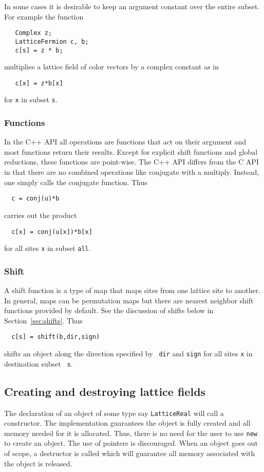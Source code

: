 \documentclass[12pt,letterpaper]{article}
\newcommand{\cpp}{C++}
\begin{document}
In some cases it is desirable to keep an argument constant over the
entire subset.  For example the function
%
\begin{verbatim}
   Complex z;
   LatticeFermion c, b;
   c[s] = z * b;
\end{verbatim}
%
multiplies a lattice field of color vectors by a complex constant as in
%
\begin{verbatim}
   c[x] = z*b[x]
\end{verbatim}
%
for {\tt x} in subset {\tt s}.

\subsubsection{Functions}

In the \cpp{} API all operations are functions that act on their
argument and most functions return their results. Except for explicit
shift functions and global reductions, these functions are point-wise.
The \cpp{} API differs from the C API in that there are no combined
operations like conjugate with a multiply.  Instead, one simply calls
the conjugate function.  Thus
%
\begin{verbatim}
  c = conj(u)*b
\end{verbatim}
%
carries out the product
%
\begin{verbatim}
  c[x] = conj(u[x])*b[x]
\end{verbatim}
%
for all sites {\tt x} in subset {\tt all}.

\subsubsection{Shift}

A shift function is a type of map that maps sites from one lattice
site to another. In general, maps can be permutation maps but there
are nearest neighbor shift functions provided by default.
See the discussion of shifts below
in Section~\ref{sec:shifts}.
Thus
%
\begin{verbatim}
  c[s] = shift(b,dir,sign)
\end{verbatim}
%
shifts an object along the direction specified by {\tt
dir} and {\tt sign} for all sites {\tt x} in destination subset {\tt
s}.


\subsection{Creating and destroying lattice fields}

The declaration of an object of some type say {\tt LatticeReal} will
call a constructor. The implementation guarantees the object is fully
created and all memory needed for it is allocated.  Thus, there is no
need for the user to use {\tt new} to create an object. The use of
pointers is discouraged.  When an object goes out of scope, a
destructor is called which will guarantee all memory associated with
the object is released.  
\end{document}

